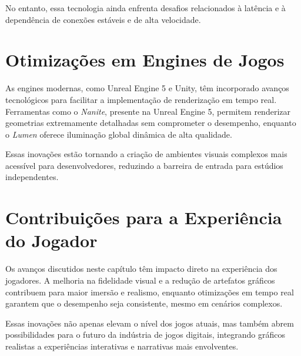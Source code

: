 No entanto, essa tecnologia ainda enfrenta desafios relacionados à latência e à dependência de conexões estáveis e de alta velocidade.

\section{Otimizações em Engines de Jogos}
As engines modernas, como Unreal Engine 5 e Unity, têm incorporado avanços tecnológicos para facilitar a implementação de renderização em tempo real. Ferramentas como o \textit{Nanite}, presente na Unreal Engine 5, permitem renderizar geometrias extremamente detalhadas sem comprometer o desempenho, enquanto o \textit{Lumen} oferece iluminação global dinâmica de alta qualidade.

Essas inovações estão tornando a criação de ambientes visuais complexos mais acessível para desenvolvedores, reduzindo a barreira de entrada para estúdios independentes.

\section{Contribuições para a Experiência do Jogador}
Os avanços discutidos neste capítulo têm impacto direto na experiência dos jogadores. A melhoria na fidelidade visual e a redução de artefatos gráficos contribuem para maior imersão e realismo, enquanto otimizações em tempo real garantem que o desempenho seja consistente, mesmo em cenários complexos.

Essas inovações não apenas elevam o nível dos jogos atuais, mas também abrem possibilidades para o futuro da indústria de jogos digitais, integrando gráficos realistas a experiências interativas e narrativas mais envolventes.


